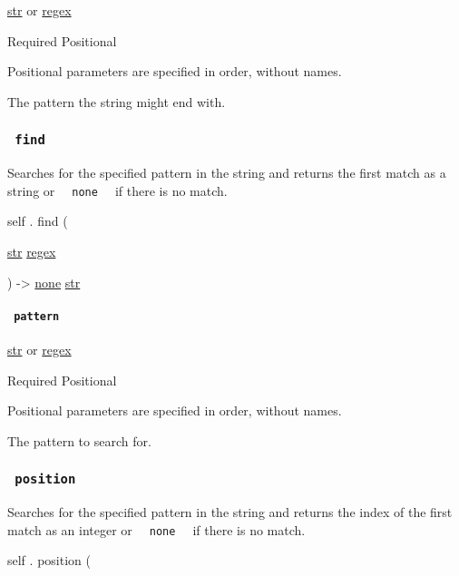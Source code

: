 \href{/docs/reference/foundations/str/}{str} {or}
\href{/docs/reference/foundations/regex/}{regex}

{Required} {{ Positional }}

\label{definitions-ends-with-pattern-positional-tooltip}
Positional parameters are specified in order, without names.

The pattern the string might end with.

\subsubsection{\texorpdfstring{\texttt{\ find\ }}{ find }}\label{definitions-find}

Searches for the specified pattern in the string and returns the first
match as a string or \texttt{\ }{\texttt{\ none\ }}\texttt{\ } if there
is no match.

self { . } { find } (

{ \href{/docs/reference/foundations/str/}{str}
\href{/docs/reference/foundations/regex/}{regex} }

) -\textgreater{} \href{/docs/reference/foundations/none/}{none}
\href{/docs/reference/foundations/str/}{str}

\paragraph{\texorpdfstring{\texttt{\ pattern\ }}{ pattern }}\label{definitions-find-pattern}

\href{/docs/reference/foundations/str/}{str} {or}
\href{/docs/reference/foundations/regex/}{regex}

{Required} {{ Positional }}

\label{definitions-find-pattern-positional-tooltip}
Positional parameters are specified in order, without names.

The pattern to search for.

\subsubsection{\texorpdfstring{\texttt{\ position\ }}{ position }}\label{definitions-position}

Searches for the specified pattern in the string and returns the index
of the first match as an integer or
\texttt{\ }{\texttt{\ none\ }}\texttt{\ } if there is no match.

self { . } { position } (

